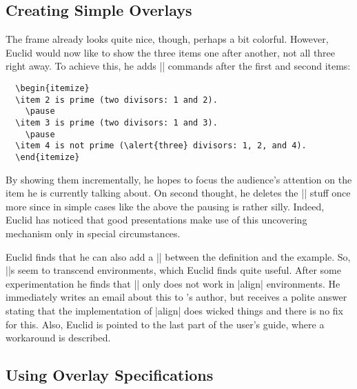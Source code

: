 \subsection{Creating Simple Overlays}

The frame already looks quite nice, though, perhaps a bit colorful. However, Euclid would now like to show the three items one after another, not all three right away. To achieve this, he adds |\pause| commands after the first and second items:
\begin{verbatim}
  \begin{itemize}
  \item 2 is prime (two divisors: 1 and 2).
    \pause
  \item 3 is prime (two divisors: 1 and 3).
    \pause
  \item 4 is not prime (\alert{three} divisors: 1, 2, and 4).
  \end{itemize}
\end{verbatim}

By showing them incrementally, he hopes to focus the audience's attention on the item he is currently talking about. On second thought, he deletes the |\pause| stuff once more since in simple cases like the above the pausing is rather silly. Indeed, Euclid has noticed that good presentations make use of this uncovering mechanism only in special circumstances.

Euclid finds that he can also add a |\pause| between the definition and the example. So, |\pause|s seem to transcend environments, which Euclid finds quite useful. After some experimentation he finds that |\pause| only does not work in |align| environments. He immediately writes an email about this to \beamer's author, but receives a polite answer stating that the implementation of |align| does wicked things and there is no fix for this. Also, Euclid is pointed to the last part of the user's guide, where a workaround is described.


\subsection{Using Overlay Specifications}

